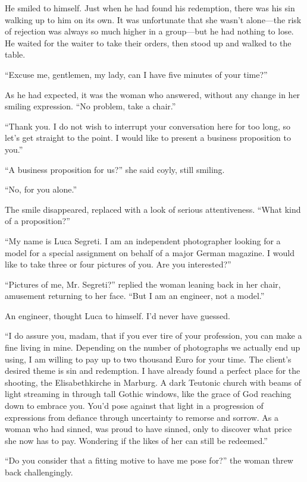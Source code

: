 He smiled to himself. Just when he had found his redemption, there was his sin walking up to him on its own. It was unfortunate that she wasn't alone---the risk of rejection was always so much higher in a group---but he had nothing to lose. He waited for the waiter to take their orders, then stood up and walked to the table.

``Excuse me, gentlemen, my lady, can I have five minutes of your time?''

As he had expected, it was the woman who answered, without any change in her smiling expression. ``No problem, take a chair.''

``Thank you. I do not wish to interrupt your conversation here for too long, so let's get straight to the point. I would like to present a business proposition to you.''

``A business proposition for us?'' she said coyly, still smiling.

``No, for you alone.''

The smile disappeared, replaced with a look of serious attentiveness. ``What kind of a proposition?''

``My name is Luca Segreti. I am an independent photographer looking for a model for a special assignment on behalf of a major German magazine. I would like to take three or four pictures of you. Are you interested?''

``Pictures of me, Mr. Segreti?'' replied the woman leaning back in her chair, amusement returning to her face. ``But I am an engineer, not a model.''

An engineer, thought Luca to himself. I'd never have guessed.

``I do assure you, madam, that if you ever tire of your profession, you can make a fine living in mine. Depending on the number of photographs we actually end up using, I am willing to pay up to two thousand Euro for your time. The client's desired theme is sin and redemption. I have already found a perfect place for the shooting, the Elisabethkirche in Marburg. A dark Teutonic church with beams of light streaming in through tall Gothic windows, like the grace of God reaching down to embrace you. You'd pose against that light in a progression of expressions from defiance through uncertainty to remorse and sorrow. As a woman who had sinned, was proud to have sinned, only to discover what price she now has to pay. Wondering if the likes of her can still be redeemed.''

``Do you consider that a fitting motive to have me pose for?'' the woman threw back challengingly.


